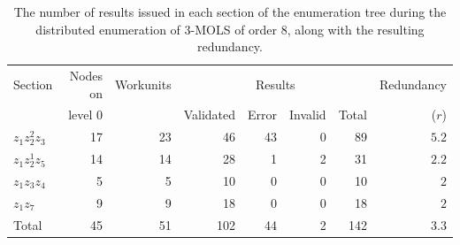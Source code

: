 %
  \begin{table}[htb]
 \centering
 \caption{The number of results issued in each section of the enumeration tree during the distributed enumeration of 3-MOLS of order 8, along with the resulting redundancy.}
\begin{tabular}{lrrrrrrr}
\toprule
Section & Nodes on    & Workunits & \multicolumn{4}{c}{Results} & Redundancy  \\
\cmidrule(lr){4-7}
 &level 0 && Validated & Error  & Invalid & Total &($r$)      \\ \midrule 
$z_1z_2^2z_3$ & 17& 23&46&43& 0& 89&$5.2$  \\ 
$z_1z_2^1z_5$ &14&14&28&1& 2&31&$2.2$   \\ 
$z_1z_3z_4$& 5&5&10&0&0&10& $2$    \\ 
$z_1z_7$ & 9&9&18&0&0&18&$2$   \\ \midrule
Total &45 &51&102&44&2&142&$3.3$   \\ \bottomrule
\end{tabular}\vspace*{.4cm}
\label{83naivesumm}
\end{table} 
